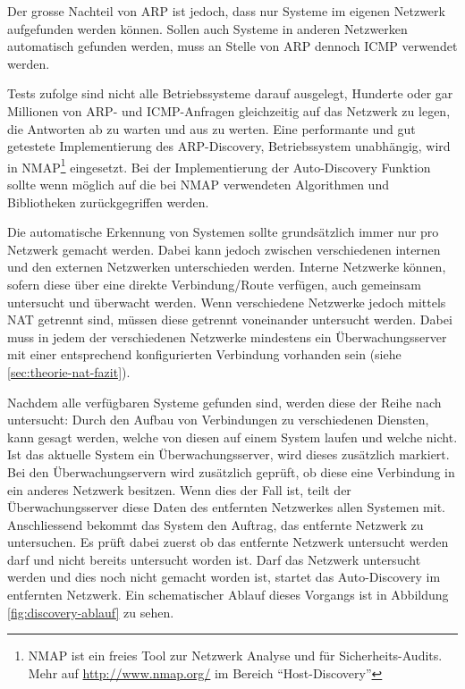 Der grosse Nachteil von ARP ist jedoch, dass nur Systeme im eigenen Netzwerk aufgefunden werden k\"onnen. Sollen auch Systeme in anderen Netzwerken automatisch gefunden werden, muss an Stelle von ARP dennoch ICMP verwendet werden.

Tests zufolge sind nicht alle Betriebssysteme darauf ausgelegt, Hunderte oder gar Millionen von ARP- und ICMP-Anfragen gleichzeitig auf das Netzwerk zu legen, die Antworten ab zu warten und aus zu werten. Eine performante und gut getestete Implementierung des ARP-Discovery, Betriebssystem unabh\"angig, wird in NMAP\footnote{\label{foot:theorie-nmap}NMAP ist ein freies Tool zur Netzwerk Analyse und f\"ur Sicherheits-Audits. Mehr auf \url{http://www.nmap.org/} im Bereich "`Host-Discovery"'} eingesetzt. Bei der Implementierung der Auto-Discovery Funktion sollte wenn m\"oglich auf die bei NMAP verwendeten Algorithmen und Bibliotheken zur\"uckgegriffen werden.

Die automatische Erkennung von Systemen sollte grunds\"atzlich immer nur pro Netzwerk gemacht werden. Dabei kann jedoch zwischen verschiedenen internen und den externen Netzwerken unterschieden werden. Interne Netzwerke k\"onnen, sofern diese \"uber eine direkte Verbindung/Route verf\"ugen, auch gemeinsam untersucht und \"uberwacht werden. Wenn verschiedene Netzwerke jedoch mittels NAT getrennt sind, m\"ussen diese getrennt voneinander untersucht werden. Dabei muss in jedem der verschiedenen Netzwerke mindestens ein \"Uberwachungsserver mit einer entsprechend konfigurierten Verbindung vorhanden sein (siehe \ref{sec:theorie-nat-fazit}).

Nachdem alle verf\"ugbaren Systeme gefunden sind, werden diese der Reihe nach untersucht: Durch den Aufbau von Verbindungen zu verschiedenen Diensten, kann gesagt werden, welche von diesen auf einem System laufen und welche nicht. Ist das aktuelle System ein \"Uberwachungsserver, wird dieses zus\"atzlich markiert. Bei den \"Uberwachungservern wird zus\"atzlich gepr\"uft, ob diese eine Verbindung in ein anderes Netzwerk besitzen. Wenn dies der Fall ist, teilt der \"Uberwachungsserver diese Daten des entfernten Netzwerkes allen Systemen mit. Anschliessend bekommt das System den Auftrag, das entfernte Netzwerk zu untersuchen. Es pr\"uft dabei zuerst ob das entfernte Netzwerk untersucht werden darf und nicht bereits untersucht worden ist. Darf das Netzwerk untersucht werden und dies noch nicht gemacht worden ist, startet das Auto-Discovery im entfernten Netzwerk. Ein schematischer Ablauf dieses Vorgangs ist in Abbildung \ref{fig:discovery-ablauf} zu sehen.

